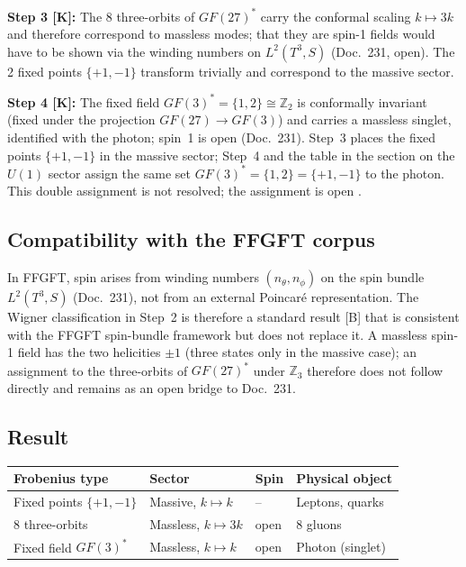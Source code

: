 \textbf{Step 3 [K]:} The 8 three-orbits of $GF(27)^*$ carry the conformal
scaling $k\mapsto3k$ and therefore correspond to massless modes; that they
are spin-1 fields would have to be shown via the winding numbers on
$L^2(T^3,S)$ (Doc.~231, open).
The 2 fixed points $\{+1,-1\}$ transform trivially and correspond to the
massive sector.

\textbf{Step 4 [K]:} The fixed field $GF(3)^*=\{1,2\}\cong\mathbb{Z}_2$
is conformally invariant (fixed under the projection $GF(27)\to GF(3)$) and
carries a massless singlet, identified with the photon; spin~1 is open
(Doc.~231).
Step~3 places the fixed points $\{+1,-1\}$ in the massive sector; Step~4 and
the table in the section on the $U(1)$ sector assign the same set
$GF(3)^*=\{1,2\}=\{+1,-1\}$ to the photon. This double assignment is not
resolved; the assignment is open \SM.

\subsection{Compatibility with the FFGFT corpus}

In FFGFT, spin arises from winding numbers $(n_\theta,n_\phi)$ on the spin
bundle $L^2(T^3,S)$ (Doc.~231), not from an external Poincaré representation.
The Wigner classification in Step~2 is therefore a standard result [B] that is
consistent with the FFGFT spin-bundle framework but does not replace it. A
massless spin-1 field has the two helicities $\pm1$ (three states only in the
massive case); an assignment to the three-orbits of $GF(27)^*$ under
$\mathbb{Z}_3$ therefore does not follow directly and remains as an open bridge
to Doc.~231.

\subsection{Result}

\begin{center}
\renewcommand{\arraystretch}{1.3}
\begin{tabular}{llll}
\toprule
Frobenius type & Sector & Spin & Physical object \\
\midrule
Fixed points $\{+1,-1\}$ & Massive, $k\mapsto k$ & -- & Leptons, quarks \\
8 three-orbits & Massless, $k\mapsto3k$ & open & 8 gluons \\
Fixed field $GF(3)^*$ & Massless, $k\mapsto k$ & open & Photon (singlet) \\
\bottomrule
\end{tabular}
\end{center}

